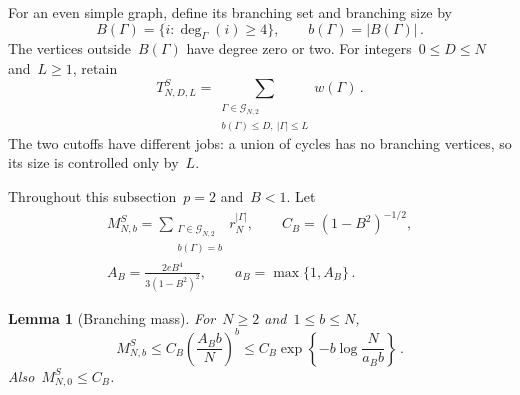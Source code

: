 \documentclass[10pt]{article}
\theoremstyle{plain}
\newtheorem{lemma}[theorem]{Lemma}
\theoremstyle{definition}
\theoremstyle{remark}
\begin{document}
For an even simple graph, define its branching set and branching size by
\begin{equation*}
 B(\Gamma)=\{i:\deg_\Gamma(i)\ge4\},\qquad b(\Gamma)=|B(\Gamma)|\,.
\end{equation*}
The vertices outside~$B(\Gamma)$ have degree zero or two. For integers~$0\le D\le N$ and~$L\ge1$, retain
\begin{equation}\label{eq:sk-target}
 T^S_{N,D,L}=\sum_{\substack{\Gamma\in\mathcal G_{N,2}\\b(\Gamma)\le D,\ |\Gamma|\le L}}w(\Gamma)\,.
\end{equation}
The two cutoffs have different jobs: a union of cycles has no branching vertices, so its size is controlled only by~$L$.

Throughout this subsection~$p=2$ and~$B<1$. Let
\begin{equation}\label{eq:tail-sk-constants}
 \begin{gathered}
 M^S_{N,b}=\sum_{\substack{\Gamma\in\mathcal G_{N,2}\\b(\Gamma)=b}}r_N^{|\Gamma|},\qquad C_B=(1-B^2)^{-1/2},\\
 A_B=\frac{2eB^4}{3(1-B^2)^2},\qquad a_B=\max\{1,A_B\}\,.
 \end{gathered}
\end{equation}
\begin{lemma}[Branching mass]\label{lem:tail-sk-mass}
For~$N\ge2$ and~$1\le b\le N$,
\begin{equation}\label{eq:tail-sk-mass}
 M^S_{N,b}\le C_B\left(\frac{A_Bb}{N}\right)^b
 \le C_B\exp\!\left\{-b\log\frac{N}{a_Bb}\right\}\,.
\end{equation}
Also~$M^S_{N,0}\le C_B$.
\end{lemma}
\end{document}
